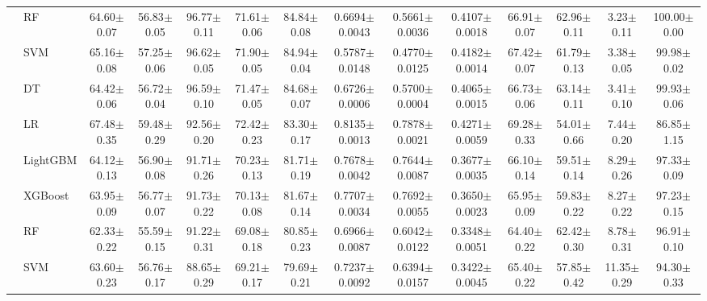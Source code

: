 \begin{tabular}{@{}llcccccccccccc@{}}
 & RF & 64.60{\tiny$\pm$0.07} & 56.83{\tiny$\pm$0.05} & 96.77{\tiny$\pm$0.11} & 71.61{\tiny$\pm$0.06} & 84.84{\tiny$\pm$0.08} & 0.6694{\tiny$\pm$0.0043} & 0.5661{\tiny$\pm$0.0036} & 0.4107{\tiny$\pm$0.0018} & 66.91{\tiny$\pm$0.07} & 62.96{\tiny$\pm$0.11} & 3.23{\tiny$\pm$0.11} & 100.00{\tiny$\pm$0.00}\\
 & SVM & 65.16{\tiny$\pm$0.08} & 57.25{\tiny$\pm$0.06} & 96.62{\tiny$\pm$0.05} & 71.90{\tiny$\pm$0.05} & 84.94{\tiny$\pm$0.04} & 0.5787{\tiny$\pm$0.0148} & 0.4770{\tiny$\pm$0.0125} & 0.4182{\tiny$\pm$0.0014} & 67.42{\tiny$\pm$0.07} & 61.79{\tiny$\pm$0.13} & 3.38{\tiny$\pm$0.05} & 99.98{\tiny$\pm$0.02}\\
 & DT & 64.42{\tiny$\pm$0.06} & 56.72{\tiny$\pm$0.04} & 96.59{\tiny$\pm$0.10} & 71.47{\tiny$\pm$0.05} & 84.68{\tiny$\pm$0.07} & 0.6726{\tiny$\pm$0.0006} & 0.5700{\tiny$\pm$0.0004} & 0.4065{\tiny$\pm$0.0015} & 66.73{\tiny$\pm$0.06} & 63.14{\tiny$\pm$0.11} & 3.41{\tiny$\pm$0.10} & 99.93{\tiny$\pm$0.06}\\
\midrule
{} & LR & 67.48{\tiny$\pm$0.35} & 59.48{\tiny$\pm$0.29} & 92.56{\tiny$\pm$0.20} & 72.42{\tiny$\pm$0.23} & 83.30{\tiny$\pm$0.17} & 0.8135{\tiny$\pm$0.0013} & 0.7878{\tiny$\pm$0.0021} & 0.4271{\tiny$\pm$0.0059} & 69.28{\tiny$\pm$0.33} & 54.01{\tiny$\pm$0.66} & 7.44{\tiny$\pm$0.20} & 86.85{\tiny$\pm$1.15}\\
 & LightGBM & 64.12{\tiny$\pm$0.13} & 56.90{\tiny$\pm$0.08} & 91.71{\tiny$\pm$0.26} & 70.23{\tiny$\pm$0.13} & 81.71{\tiny$\pm$0.19} & 0.7678{\tiny$\pm$0.0042} & 0.7644{\tiny$\pm$0.0087} & 0.3677{\tiny$\pm$0.0035} & 66.10{\tiny$\pm$0.14} & 59.51{\tiny$\pm$0.14} & 8.29{\tiny$\pm$0.26} & 97.33{\tiny$\pm$0.09}\\
 & XGBoost & 63.95{\tiny$\pm$0.09} & 56.77{\tiny$\pm$0.07} & 91.73{\tiny$\pm$0.22} & 70.13{\tiny$\pm$0.08} & 81.67{\tiny$\pm$0.14} & 0.7707{\tiny$\pm$0.0034} & 0.7692{\tiny$\pm$0.0055} & 0.3650{\tiny$\pm$0.0023} & 65.95{\tiny$\pm$0.09} & 59.83{\tiny$\pm$0.22} & 8.27{\tiny$\pm$0.22} & 97.23{\tiny$\pm$0.15}\\
 & RF & 62.33{\tiny$\pm$0.22} & 55.59{\tiny$\pm$0.15} & 91.22{\tiny$\pm$0.31} & 69.08{\tiny$\pm$0.18} & 80.85{\tiny$\pm$0.23} & 0.6966{\tiny$\pm$0.0087} & 0.6042{\tiny$\pm$0.0122} & 0.3348{\tiny$\pm$0.0051} & 64.40{\tiny$\pm$0.22} & 62.42{\tiny$\pm$0.30} & 8.78{\tiny$\pm$0.31} & 96.91{\tiny$\pm$0.10}\\
 & SVM & 63.60{\tiny$\pm$0.23} & 56.76{\tiny$\pm$0.17} & 88.65{\tiny$\pm$0.29} & 69.21{\tiny$\pm$0.17} & 79.69{\tiny$\pm$0.21} & 0.7237{\tiny$\pm$0.0092} & 0.6394{\tiny$\pm$0.0157} & 0.3422{\tiny$\pm$0.0045} & 65.40{\tiny$\pm$0.22} & 57.85{\tiny$\pm$0.42} & 11.35{\tiny$\pm$0.29} & 94.30{\tiny$\pm$0.33}\\

\end{tabular}
